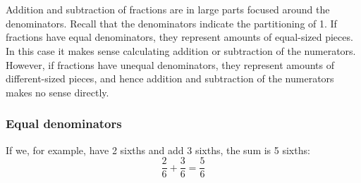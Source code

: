 \section{\bradsub}
Addition and subtraction of fractions are in large parts focused around the denominators. Recall that the denominators indicate the partitioning of 1. If fractions have equal denominators, they represent amounts of equal-sized pieces. In this case it makes sense calculating addition or subtraction of the numerators. However, if fractions have unequal denominators, they represent amounts of different-sized pieces, and hence addition and subtraction of the numerators makes no sense directly.
\subsubsection{Equal denominators}
If we, for example, have 2 sixths and add 3 sixths, the sum is 5 sixths:
\[ \frac{2}{6}+\frac{3}{6}=\frac{5}{6} \]
\regv
{}
\newpage
{}

